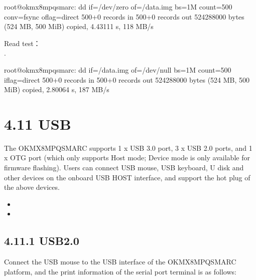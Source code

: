 \documentclass[letterpaper,10pt,openany,english]{sphinxmanual}
\begin{document}
\begin{sphinxVerbatim}[commandchars=\\\{\}]
root@ok\PYGZhy{}mx8mpq\PYGZhy{}smarc:\PYGZti{}\PYGZsh{} dd if=/dev/zero of=/data.img bs=1M count=500 conv=fsync oflag=direct
500+0 records in
500+0 records out
524288000 bytes (524 MB, 500 MiB) copied, 4.43111 s, 118 MB/s
\end{sphinxVerbatim}

\sphinxAtStartPar
Read test：\\
.

\begin{sphinxVerbatim}[commandchars=\\\{\}]
root@ok\PYGZhy{}mx8mpq\PYGZhy{}smarc:\PYGZti{}\PYGZsh{} dd if=/data.img of=/dev/null bs=1M count=500 iflag=direct
500+0 records in
500+0 records out
524288000 bytes (524 MB, 500 MiB) copied, 2.80064 s, 187 MB/s
\end{sphinxVerbatim}


\section{4.11 USB}
\label{\detokenize{linux-manual:usb}}
\sphinxAtStartPar
The OK\sphinxhyphen{}MX8MPQ\sphinxhyphen{}SMARC supports 1 x USB 3.0 port, 3 x USB 2.0 ports, and 1 x OTG port (which only supports Host mode; Device mode is only available for firmware flashing). Users can connect USB mouse, USB keyboard, U disk and other devices on the on\sphinxhyphen{}board USB HOST interface, and support the hot plug of the above devices.\\
\begin{itemize}
\item {} 
\sphinxAtStartPar
{}

\item {} 
\sphinxAtStartPar
{}

\end{itemize}


\subsection{4.11.1 USB2.0}
\label{\detokenize{linux-manual:usb2-0}}
\sphinxAtStartPar
Connect the USB mouse to the USB interface of the OK\sphinxhyphen{}MX8MPQ\sphinxhyphen{}SMARC platform, and the print information of the serial port terminal is as follows:
\end{document}
